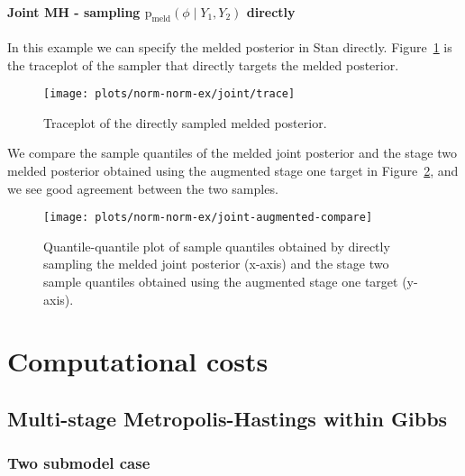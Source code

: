 \documentclass[10pt,a4paper,]{article}
\let\oldparagraph\paragraph
\renewcommand{\paragraph}[1]{\oldparagraph{#1}\mbox{}}
\newcommand{\pd}{\text{p}}
\newcommand{\pmeld}{\pd_{\text{meld}}}
\begin{document}
\paragraph{\texorpdfstring{Joint MH - sampling
\(\pmeld(\phi \mid Y_{1}, Y_{2})\)
directly}{Joint MH - sampling \textbackslash{}pmeld(\textbackslash{}phi \textbackslash{}mid Y\_\{1\}, Y\_\{2\}) directly}}\label{joint-mh---sampling-pmeldphi-mid-y_1-y_2-directly}

In this example we can specify the melded posterior in Stan directly.
Figure~\ref{fig:joint_trace} is the traceplot of the sampler that
directly targets the melded posterior.

\begin{figure}

{\centering \texttt{[image: plots/norm-norm-ex/joint/trace]} 

}

\caption{Traceplot of the directly sampled melded posterior.}\label{fig:joint_trace}
\end{figure}

We compare the sample quantiles of the melded joint posterior and the
stage two melded posterior obtained using the augmented stage one target
in Figure~\ref{fig:joint_augmented_compare}, and we see good agreement
between the two samples.

\begin{figure}

{\centering \texttt{[image: plots/norm-norm-ex/joint-augmented-compare]} 

}

\caption{Quantile-quantile plot of sample quantiles obtained by directly sampling the melded joint posterior (x-axis) and the stage two sample quantiles obtained using the augmented stage one target (y-axis).}\label{fig:joint_augmented_compare}
\end{figure}

\section{Computational costs}\label{computational-costs}

\subsection{Multi-stage Metropolis-Hastings within
Gibbs}\label{multi-stage-metropolis-hastings-within-gibbs}

\subsubsection*{Two submodel case}\label{two-submodel-case}
\end{document}
